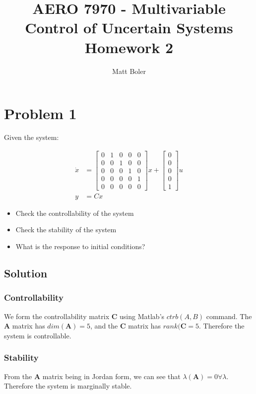 \documentclass[]{article}
\title{AERO 7970 - Multivariable Control of Uncertain Systems \\ Homework 2}
\author{Matt Boler}
\begin{document}
\maketitle

\section{Problem 1}

Given the system:

\begin{align*}
	\dot{x} &= \begin{bmatrix}
	0 & 1 & 0 & 0 & 0 \\
	0 & 0 & 1 & 0 & 0 \\
	0 & 0 & 0 & 1 & 0 \\
	0 & 0 & 0 & 0 & 1 \\
	0 & 0 & 0 & 0 & 0
	\end{bmatrix}
	x + \begin{bmatrix}
	0 \\
	0 \\
	0 \\
	0 \\
	1
	\end{bmatrix}u
	\\
	y &= Cx
\end{align*}

\begin{itemize}
	\item Check the controllability of the system
	\item Check the stability of the system
	\item What is the response to initial conditions?
\end{itemize}

\subsection{Solution}

\subsubsection{Controllability}

We form the controllability matrix $\mathbf{C}$ using Matlab's $ctrb(A, B)$ command.
The $\mathbf{A}$ matrix has $dim(\mathbf{A})=5$, and the $\mathbf{C}$ matrix has $rank(\mathbf{C}=5$.
Therefore the system is controllable.

\subsubsection{Stability}
From the $\mathbf{A}$ matrix being in Jordan form, we can see that $\lambda(\mathbf{A}) = 0 \forall \lambda$.
Therefore the system is marginally stable.
\end{document}
